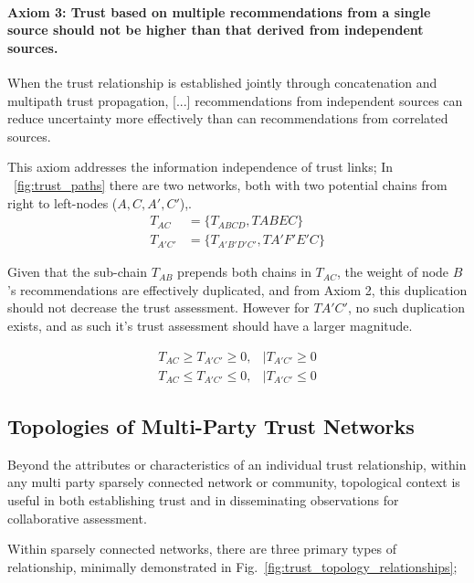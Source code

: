\paragraph{Axiom 3: Trust based on multiple recommendations from a single source should not be higher than that derived from independent sources.}

\begin{displayquote}
	When the trust relationship is established jointly through concatenation and multipath trust propagation, [...] recommendations from independent sources can reduce uncertainty more effectively than can recommendations from correlated sources.
\end{displayquote}

This axiom addresses the information independence of trust links; In ~\autoref{fig:trust_paths} there are two networks, both with two potential chains from right to left-nodes ($A,C,A',C'$),.
\begin{align}
T_{AC}&=\{T_{ABCD}, T{ABEC}\}\\
T_{A'C'}&=\{T_{A'B'D'C'}, T{A'F'E'C}\}
\end{align}

Given that the sub-chain $T_{AB}$ prepends both chains in $T_{AC}$, the weight of node $B$'s recommendations are effectively duplicated, and from Axiom 2, this duplication should not decrease the trust assessment.
However for $T{A'C'}$, no such duplication exists, and as such it's trust assessment should have a larger magnitude.

\begin{align}
T_{AC} \geq T_{A'C'} \geq 0, &| T_{A'C'} \geq 0\\
T_{AC} \leq T_{A'C'} \leq 0, &| T_{A'C'} \le 0
\end{align}


\subsection{Topologies of Multi-Party Trust Networks}\label{sec:trust_topologies}
Beyond the attributes or characteristics of an individual trust relationship, within any multi party sparsely connected network or community, topological context is useful in both establishing trust and in disseminating observations for collaborative assessment.

Within sparsely connected networks, there are three primary types of relationship, minimally demonstrated in Fig.~\ref{fig:trust_topology_relationships};

